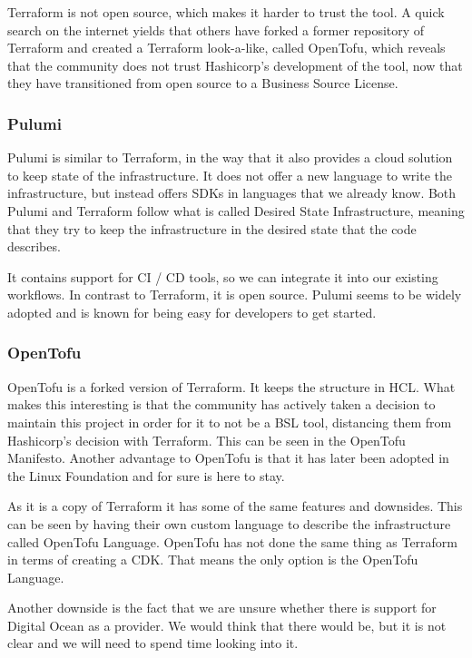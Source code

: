 Terraform is not open source, which makes it harder to trust the tool. A quick search on the internet yields that others have forked a former repository of Terraform and created a Terraform look-a-like, called OpenTofu, which reveals that the community does not trust Hashicorp's development of the tool, now that they have transitioned from open source to a Business Source License.

\subsubsection{Pulumi}

Pulumi is similar to Terraform, in the way that it also provides a cloud solution to keep state of the infrastructure. It does not offer a new language to write the infrastructure, but instead offers SDKs in languages that we already know. Both Pulumi and Terraform follow what is called Desired State Infrastructure, meaning that they try to keep the infrastructure in the desired state that the code describes.

It contains support for CI / CD tools, so we can integrate it into our existing workflows. In contrast to Terraform, it is open source. Pulumi seems to be widely adopted and is known for being easy for developers to get started.

\subsubsection{OpenTofu}

OpenTofu is a forked version of Terraform. It keeps the structure in HCL. What makes this interesting is that the community has actively taken a decision to maintain this project in order for it to not be a BSL tool, distancing them from Hashicorp's decision with Terraform. This can be seen in the OpenTofu Manifesto\cite{opentofu_manifesto}. Another advantage to OpenTofu is that it has later been adopted in the Linux Foundation and for sure is here to stay.

As it is a copy of Terraform it has some of the same features and downsides. This can be seen by having their own custom language to describe the infrastructure called OpenTofu Language. OpenTofu has not done the same thing as Terraform in terms of creating a CDK. That means the only option is the OpenTofu Language.

Another downside is the fact that we are unsure whether there is support for Digital Ocean as a provider. We would think that there would be, but it is not clear and we will need to spend time looking into it.

